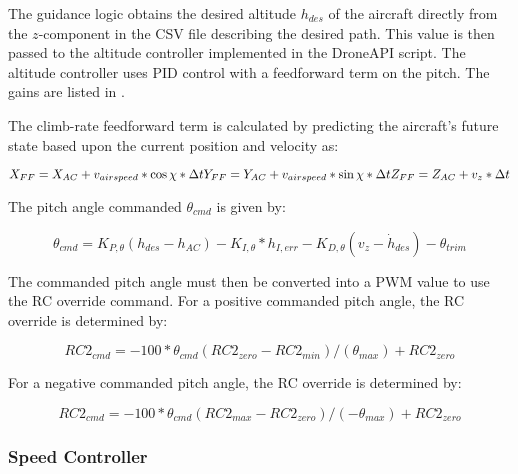 \documentclass{aiaa}
\begin{document}
The guidance logic obtains the desired altitude $h_{des}$ of the aircraft directly from the $z$-component in the CSV file describing the desired path. This value is then passed to the altitude controller implemented in the DroneAPI script. The altitude controller uses PID control with a feedforward term on the pitch. The gains are listed in .

The climb-rate feedforward term is calculated by predicting the aircraft's future state based upon the current position and velocity as:

\begin{equation}
X_{FF} = X_{AC} + v_{airspeed}*\cos{\chi}*\Delta t
\newline
Y_{FF} = Y_{AC} + v_{airspeed}*\sin{\chi}*\Delta t
\newline
Z_{FF} = Z_{AC} + v_z*\Delta t
\end{equation}

The pitch angle commanded $\theta_{cmd}$ is given by:

\begin{equation} \theta_{cmd} = K_{P,\theta}(h_{des} - h_{AC}) - K_{I,\theta}*h_{I,err} - K_{D,\theta}(v_z - \dot{h}_{des}) - \theta_{trim}
\end{equation}


The commanded pitch angle must then be converted into a PWM value to use the RC override command. For a positive commanded pitch angle, the RC override is determined by:

\begin{equation}
RC2_{cmd} = -100*\theta_{cmd}(RC2_{zero} - RC2_{min})/(\theta_{max}) + RC2_{zero}
\end{equation}

For a negative commanded pitch angle, the RC override is determined by:

\begin{equation}
RC2_{cmd} = -100*\theta_{cmd}(RC2_{max} - RC2_{zero})/(-\theta_{max}) + RC2_{zero}
\end{equation}

\subsubsection{Speed Controller}
\end{document}
